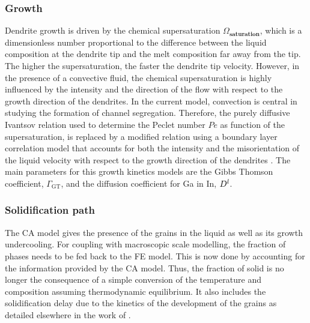 \subsubsection{Growth}
Dendrite growth is driven by the chemical supersaturation $\Omega_\textbf{saturation}$, which is a 
dimensionless number proportional to the difference between the liquid composition at the dendrite 
tip and the melt composition far away from the tip. The higher the supersaturation, the faster the 
dendrite tip velocity. However, in the presence of a convective fluid, the chemical supersaturation 
is highly influenced by the intensity and the direction of the flow with respect to the growth direction 
of the dendrites. In the current model, convection is central in studying the formation of channel segregation. Therefore, 
the purely diffusive Ivantsov relation used to determine the Peclet number $Pe$ as function of the supersaturation, 
is replaced by a modified relation using a boundary layer correlation model that accounts for both the intensity 
and the misorientation of the liquid velocity with respect to the growth direction of the dendrites \citep{gandin_boundary_2003}. 
The main parameters for this growth kinetics models are the Gibbs Thomson coefficient, $\Gamma_{\text{GT}}$, and the diffusion 
coefficient for Ga in In, $D^l$.

\subsubsection{Solidification path}
The CA model gives the presence of the grains in the liquid as well as its growth undercooling. 
For coupling with macroscopic scale modelling, the fraction of phases needs to be fed back to the 
FE model. This is now done by accounting for the information provided by the CA model. Thus, the 
fraction of solid is no longer the consequence of a simple conversion of the temperature and 
composition assuming thermodynamic equilibrium. It also includes the solidification delay due to 
the kinetics of the development of the grains as detailed elsewhere in the work of \citet{carozzani_direct_2013}.

